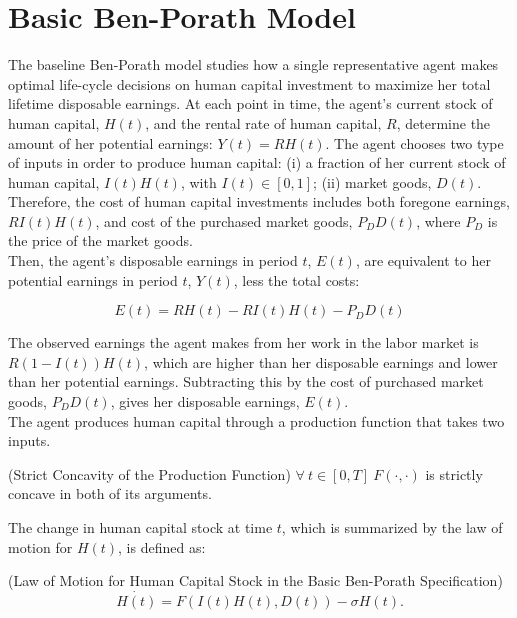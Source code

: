 \section{Basic Ben-Porath Model} \label{section:baseline}

The baseline Ben-Porath model studies how a single representative agent makes optimal life-cycle decisions on human capital investment to maximize her total lifetime disposable earnings. At each point in time, the agent's current stock of human capital, $H(t)$, and the rental rate of human capital, $R$, determine the amount of her potential earnings: $Y(t)=RH(t)$. The agent chooses two type of inputs in order to produce human capital: (i) a fraction of her current stock of human capital, $I(t)H(t)$, with $I(t) \in [0,1]$; (ii) market goods, $D(t)$. Therefore, the cost of human capital investments includes both foregone earnings, $RI(t)H(t)$, and cost of the purchased market goods, $P_DD(t)$, where $P_D$ is the price of the market goods.\\
\indent Then, the agent's disposable earnings in period $t$, $E(t)$, are equivalent to her potential earnings in period $t$, $Y(t)$, less the total costs:

\begin{equation}
E(t) = R H(t) -  R I(t) H(t) - P_{D} D(t) \label{eq:earnings}
\end{equation}

\indent The observed earnings the agent makes from her work in the labor market is $R(1-I(t))H(t)$, which are higher than her disposable earnings and lower than her potential earnings. Subtracting this by the cost of purchased market goods, $P_DD(t)$, gives her disposable earnings, $E(t)$.\\
\indent The agent produces human capital through a production function that takes two inputs.

\begin{assumption} (Strict Concavity of the Production Function) \label{assumption:scpf}  $\forall \ t \in [0,T] \ F(\cdot, \cdot)$ is strictly concave in both of its arguments.
\end{assumption}

\indent The change in human capital stock at time $t$, which is summarized by the law of motion for $H(t)$, is defined as: 

\begin{definition} (Law of Motion for Human Capital Stock in the Basic Ben-Porath Specification)
\begin{equation}
\dot{H(t)} = F \left( I(t) H(t), D(t) \right) - \sigma H(t). \label{eq:lawh}
\end{equation}
\end{definition}

